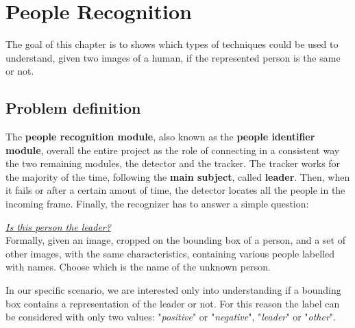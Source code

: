 \chapter{People Recognition} \label{cha:recognition}
The goal of this chapter is to shows which types of techniques could be used to understand, given two images of a human, if the represented person is the same or not.

\section{Problem definition}
The \textbf{people recognition module}, also known as the \textbf{people identifier module}, overall the entire project as the role of connecting in a consistent way the two remaining modules, the detector and the tracker. The tracker works for the majority of the time, following the \textbf{main subject}, called \textbf{leader}. Then, when it fails or after a certain amout of time, the detector locates all the people in the incoming frame. Finally, the recognizer has to answer a simple question:
\begin{tcolorbox}
	\begin{center}
		\underline{\textit{Is this person the leader?}}\\
		Formally, given an image, cropped on the bounding box of a person, and a set of other images, with the same characteristics, containing various people labelled with names. Choose which is the name of the unknown person.
	\end{center}
\end{tcolorbox}
In our specific scenario, we are interested only into understanding if a bounding box contains a representation of the leader or not. For this reason the label can be considered with only two values: "\textit{positive}" or "\textit{negative}", "\textit{leader}" or "\textit{other}".\\

